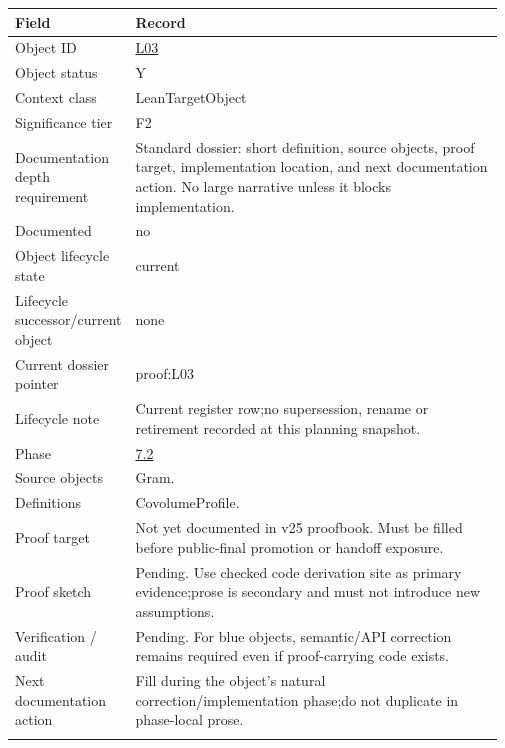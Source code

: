 \begin{longtable}{L{0.16\linewidth} L{0.81\linewidth}}
\hline
\textbf{Field} & \textbf{Record}\\
\hline
Object ID & \hyperlink{object-row-L03}{L03}\\
\hline\addlinespace[0.20em]
Object status & Y\\
\hline\addlinespace[0.20em]
Context class & LeanTargetObject\\
\hline\addlinespace[0.20em]
Significance tier & F2\\
\hline\addlinespace[0.20em]
Documentation depth requirement & Standard dossier: short definition, source objects, proof target, implementation location, and next documentation action. No large narrative unless it blocks implementation.\\
\hline\addlinespace[0.20em]
Documented & no\\
\hline\addlinespace[0.20em]
Object lifecycle state & current\\
\hline\addlinespace[0.20em]
Lifecycle successor/\allowbreak{}current object & none\\
\hline\addlinespace[0.20em]
Current dossier pointer & proof:L03\\
\hline\addlinespace[0.20em]
Lifecycle note & Current register row;\newline no supersession, rename or retirement recorded at this planning snapshot.\\
\hline\addlinespace[0.20em]
Phase & \hyperlink{phase-row-7-2}{7.2}\\
\hline\addlinespace[0.20em]
Source objects & Gram.\\
\hline\addlinespace[0.20em]
Definitions & CovolumeProfile.\\
\hline\addlinespace[0.20em]
Proof target & Not yet documented in v25 proofbook. Must be filled before public-final promotion or handoff exposure.\\
\hline\addlinespace[0.20em]
Proof sketch & Pending. Use checked code derivation site as primary evidence;\newline prose is secondary and must not introduce new assumptions.\\
\hline\addlinespace[0.20em]
Verification /\allowbreak{} audit & Pending. For blue objects, semantic/\allowbreak{}API correction remains required even if proof-carrying code exists.\\
\hline\addlinespace[0.20em]
Next documentation action & Fill during the object's natural correction/\allowbreak{}implementation phase;\newline do not duplicate in phase-local prose.\\
\hline\addlinespace[0.20em]
\end{longtable}
